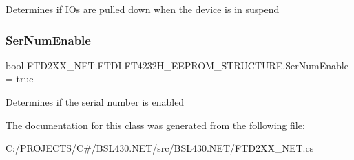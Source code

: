 Determines if I\+Os are pulled down when the device is in suspend 

\mbox{\label{class_f_t_d2_x_x___n_e_t_1_1_f_t_d_i_1_1_f_t4232_h___e_e_p_r_o_m___s_t_r_u_c_t_u_r_e_a7838c1b827085f44a84cc418e9adfdbe}} 
\subsubsection{\texorpdfstring{SerNumEnable}{SerNumEnable}}
{\footnotesize\ttfamily bool F\+T\+D2\+X\+X\+\_\+\+N\+E\+T.\+F\+T\+D\+I.\+F\+T4232\+H\+\_\+\+E\+E\+P\+R\+O\+M\+\_\+\+S\+T\+R\+U\+C\+T\+U\+R\+E.\+Ser\+Num\+Enable = true}



Determines if the serial number is enabled 



The documentation for this class was generated from the following file\+:\begin{DoxyCompactItemize}
\item 
C\+:/\+P\+R\+O\+J\+E\+C\+T\+S/\+C\#/\+B\+S\+L430.\+N\+E\+T/src/\+B\+S\+L430.\+N\+E\+T/F\+T\+D2\+X\+X\+\_\+\+N\+E\+T.\+cs\end{DoxyCompactItemize}
